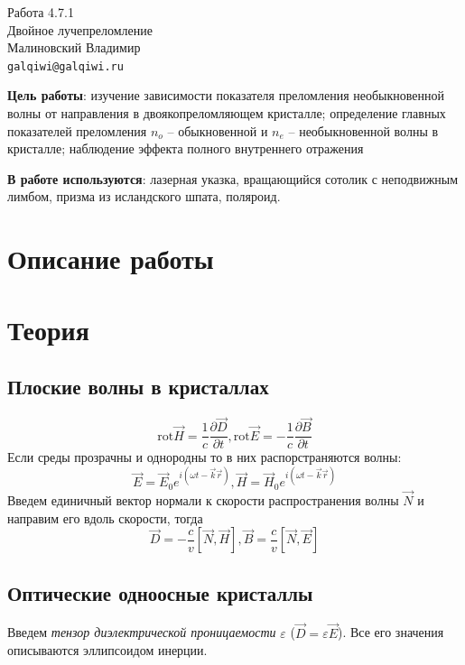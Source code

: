 
\usepackage{booktabs}
\usepackage{multirow}

\usepackage{wrapfig}



\begin{center}
  \LARGE{Работа 4.7.1}\\[0.2cm]
  \LARGE{Двойное лучепреломление}\\[0.2cm]
  \large{Малиновский Владимир}\\[0.2cm]
  \normalsize{\texttt{galqiwi@galqiwi.ru}}
\end{center}

\textbf{Цель работы}: изучение зависимости показателя преломления необыкновенной волны от направления в двоякопреломляющем кристалле; определение главных показателей преломления $n_o$ -- обыкновенной и $n_e$ -- необыкновенной волны в кристалле; наблюдение эффекта полного внутреннего отражения

\textbf{В работе используются}: лазерная указка, вращающийся сотолик с неподвижным лимбом, призма из исландского шпата, поляроид.
\section*{Описание работы}

\section*{Теория}
\subsection*{Плоские волны в кристаллах}
\begin{equation}
\text{rot} \vec{H} = \dfrac{1}{c}\dfrac{\partial \vec{D}}{\partial t}, \text{rot} \vec{E} = -\dfrac{1}{c}\dfrac{\partial \vec{B}}{\partial t}
\end{equation}
Если среды прозрачны и однородны то в них распорстраняются волны:
\begin{equation}
\vec E = \vec{E}_0 e^{i(\omega t - \vec{k}\vec{r})}, \vec{H} = \vec{H}_0e^{i(\omega t - \vec{k}\vec{r})}
\end{equation}
Введем единичный вектор нормали к скорости распространения волны $\vec{N}$ и направим его вдоль скорости, тогда
\begin{equation}
\vec{D} = -\dfrac{c}{v}\left[\vec{N}, \vec{H}\right], \vec{B} = \dfrac{c}{v}\left[  \vec{N}, \vec{E}\right]
\end{equation}
\subsection*{Оптические одноосные кристаллы}
Введем \textit{тензор диэлектрической проницаемости} $\varepsilon$ ($\vec{D} = \varepsilon \vec{E}$). Все его значения описываются эллипсоидом инерции. 

